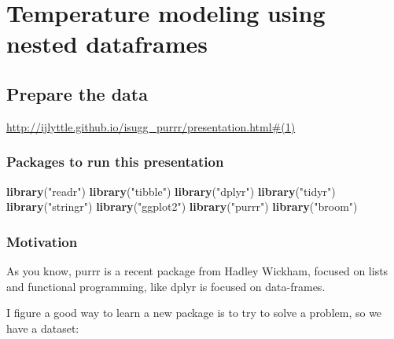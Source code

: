 \documentclass[]{book}
\newenvironment{Shaded}{\begin{snugshade}}{\end{snugshade}}
\newcommand{\KeywordTok}[1]{\textcolor[rgb]{0.13,0.29,0.53}{\textbf{#1}}}
\newcommand{\NormalTok}[1]{#1}
\newcommand{\StringTok}[1]{\textcolor[rgb]{0.31,0.60,0.02}{#1}}
\begin{document}
\hypertarget{temperature-modeling-using-nested-dataframes}{%
\chapter{Temperature modeling using nested dataframes}\label{temperature-modeling-using-nested-dataframes}}

\hypertarget{prepare-the-data}{%
\section{Prepare the data}\label{prepare-the-data}}

\url{http://ijlyttle.github.io/isugg_purrr/presentation.html\#(1)}

\hypertarget{packages-to-run-this-presentation}{%
\subsection{Packages to run this presentation}\label{packages-to-run-this-presentation}}

\begin{Shaded}
\begin{Highlighting}[]
\KeywordTok{library}\NormalTok{(}\StringTok{"readr"}\NormalTok{)}
\KeywordTok{library}\NormalTok{(}\StringTok{"tibble"}\NormalTok{)}
\KeywordTok{library}\NormalTok{(}\StringTok{"dplyr"}\NormalTok{)}
\KeywordTok{library}\NormalTok{(}\StringTok{"tidyr"}\NormalTok{)}
\KeywordTok{library}\NormalTok{(}\StringTok{"stringr"}\NormalTok{)}
\KeywordTok{library}\NormalTok{(}\StringTok{"ggplot2"}\NormalTok{)}
\KeywordTok{library}\NormalTok{(}\StringTok{"purrr"}\NormalTok{)}
\KeywordTok{library}\NormalTok{(}\StringTok{"broom"}\NormalTok{)}
\end{Highlighting}
\end{Shaded}

\hypertarget{motivation}{%
\subsection{Motivation}\label{motivation}}

As you know, purrr is a recent package from Hadley Wickham, focused on lists and functional programming, like dplyr is focused on data-frames.

I figure a good way to learn a new package is to try to solve a problem, so we have a dataset:
\end{document}
